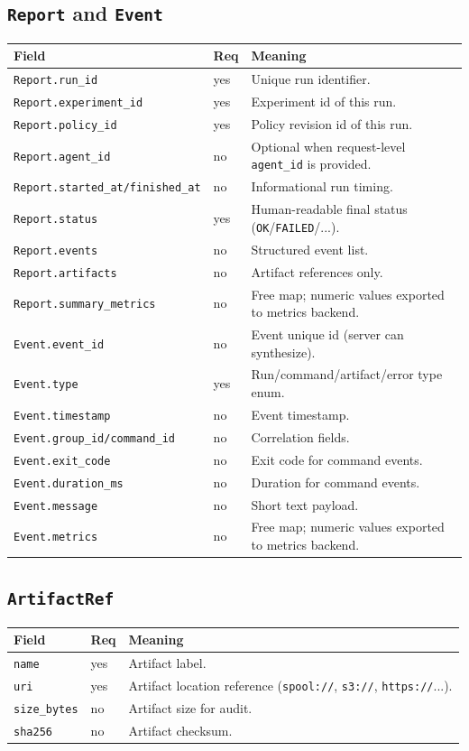 \documentclass[11pt,a4paper]{article}
\begin{document}
\subsection{\texttt{Report} and \texttt{Event}}
\begin{longtable}{p{4.1cm}p{1.6cm}p{9.3cm}}
\textbf{Field} & \textbf{Req} & \textbf{Meaning} \\
\hline
\endhead
\texttt{Report.run\_id} & yes & Unique run identifier. \\
\texttt{Report.experiment\_id} & yes & Experiment id of this run. \\
\texttt{Report.policy\_id} & yes & Policy revision id of this run. \\
\texttt{Report.agent\_id} & no & Optional when request-level \texttt{agent\_id} is provided. \\
\texttt{Report.started\_at/finished\_at} & no & Informational run timing. \\
\texttt{Report.status} & yes & Human-readable final status (\texttt{OK}/\texttt{FAILED}/...). \\
\texttt{Report.events} & no & Structured event list. \\
\texttt{Report.artifacts} & no & Artifact references only. \\
\texttt{Report.summary\_metrics} & no & Free map; numeric values exported to metrics backend. \\
\texttt{Event.event\_id} & no & Event unique id (server can synthesize). \\
\texttt{Event.type} & yes & Run/command/artifact/error type enum. \\
\texttt{Event.timestamp} & no & Event timestamp. \\
\texttt{Event.group\_id/command\_id} & no & Correlation fields. \\
\texttt{Event.exit\_code} & no & Exit code for command events. \\
\texttt{Event.duration\_ms} & no & Duration for command events. \\
\texttt{Event.message} & no & Short text payload. \\
\texttt{Event.metrics} & no & Free map; numeric values exported to metrics backend. \\
\hline
\end{longtable}

\subsection{\texttt{ArtifactRef}}
\begin{longtable}{p{4.1cm}p{1.6cm}p{9.3cm}}
\textbf{Field} & \textbf{Req} & \textbf{Meaning} \\
\hline
\endhead
\texttt{name} & yes & Artifact label. \\
\texttt{uri} & yes & Artifact location reference (\texttt{spool://}, \texttt{s3://}, \texttt{https://}...). \\
\texttt{size\_bytes} & no & Artifact size for audit. \\
\texttt{sha256} & no & Artifact checksum. \\
\hline
\end{longtable}
\end{document}
